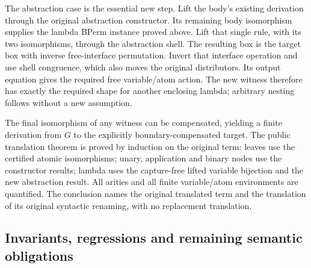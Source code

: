 





The abstraction case is the essential new step. Lift the body's existing
derivation through the original abstraction constructor. Its remaining body
isomorphism supplies the lambda BPerm instance proved above. Lift that single
rule, with its two isomorphisms, through the abstraction shell. The resulting
box is the target box with inverse free-interface permutation. Invert that
interface operation and use shell congruence, which also moves the original
distributors. Its output equation gives the required free variable/atom action.
The new witness therefore has exactly the required shape for another enclosing
lambda; arbitrary nesting follows without a new assumption.


The final isomorphism of any witness can be compensated, yielding a finite
derivation from $G$ to the explicitly boundary-compensated target. The public
translation theorem is proved by induction on the original term: leaves use the
certified atomic isomorphisms; unary, application and binary nodes use the
constructor results; lambda uses the capture-free lifted variable bijection and
the new abstraction result. All arities and all finite variable/atom environments
are quantified. The conclusion names the original translated term and the
translation of its original syntactic renaming, with no replacement translation.



\subsection{Invariants, regressions and remaining semantic obligations}

